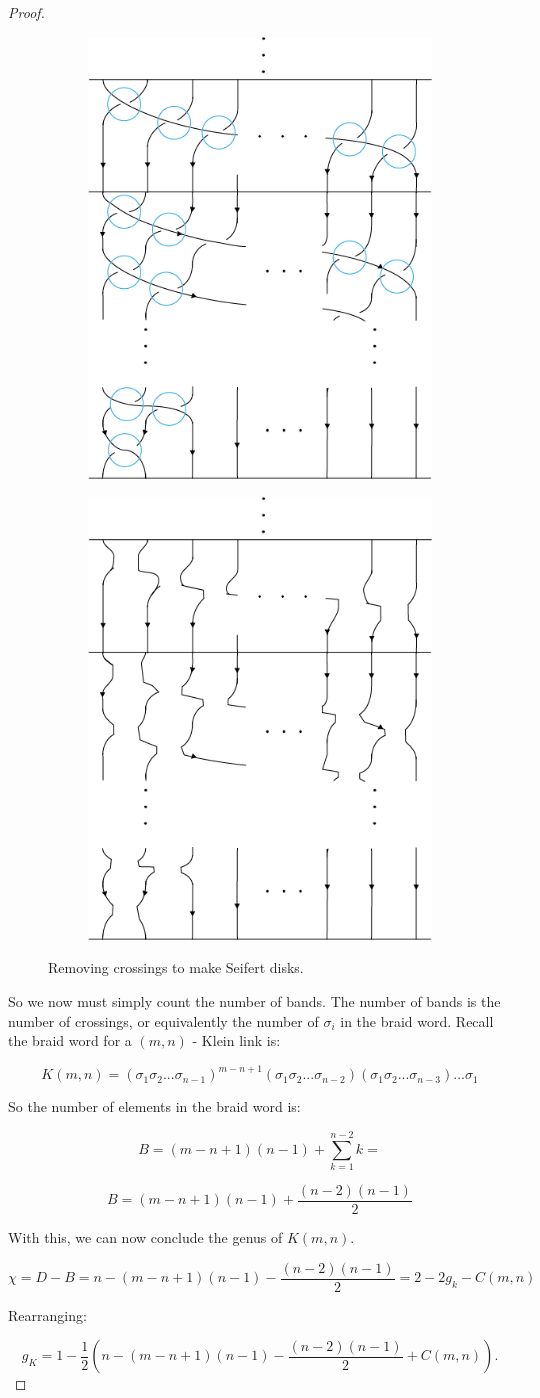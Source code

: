 \documentclass[12pt]{article}
\begin{document}
\begin{proof}
\begin{figure}[H]
\centering
\begin{subfigure}{.7\textwidth}
  \centering
  \includegraphics[width=.4\linewidth]{Klein_link_Seifert_Circles_Switch}
  \label{fig:sub1}
\end{subfigure}%
\begin{subfigure}{.7\textwidth}
  \includegraphics[width=.4\linewidth]{Klein_link_Seifert_Disks}
  \label{fig:sub2}
\end{subfigure}
\caption{\label{Crossing Switch} Removing crossings to make Seifert disks.}
\label{fig:test}
\end{figure}

So we now must simply count the number of bands. The number of bands is the number of crossings, or equivalently the number of $\sigma_i$ in the braid word.  Recall the braid word for a $(m, n)$ - Klein link is:

$$
K(m, n) = (\sigma_1 \sigma_2... \sigma_{n-1})^{m-n+1}(\sigma_1 \sigma_2... \sigma_{n-2})(\sigma_1 \sigma_2... \sigma_{n-3})...\sigma_1
$$

So the number of elements in the braid word is:

$$
B = (m - n + 1)(n - 1) + \sum_{k = 1}^{n-2}k = 
$$

\begin{equation}
B = (m - n + 1)(n - 1) + \frac{(n-2)(n-1)}{2}
\end{equation}

With this, we can now conclude the genus of $K(m, n)$.

$$
\chi = D - B = n - (m - n + 1)(n-1) - \frac{(n-2)(n-1)}{2} = 2 - 2g_k - C(m, n)
$$

Rearranging:

$$
g_K = 1 - \frac{1}{2}\left(n - (m - n + 1)(n-1) - \frac{(n-2)(n-1)}{2} + C(m, n)\right).
$$

\end{proof}
\end{document}
